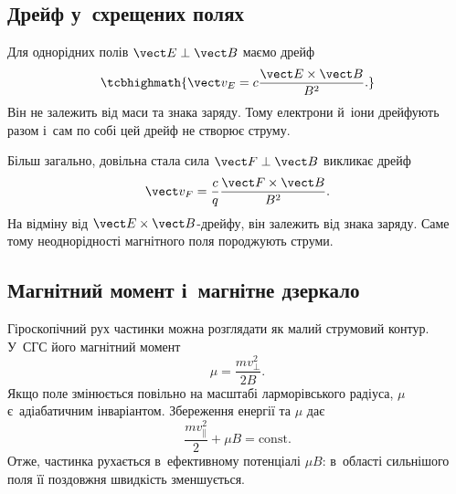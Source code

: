\subsection*{Дрейф у~схрещених полях}



Для однорідних полів $\vect E\perp\vect B$ маємо дрейф
\begin{equation}\label{eq:ExB}
	\tcbhighmath{\vect v_E=c\frac{\vect E\times\vect B}{B^2}.}
\end{equation}
Він не залежить від маси та знака заряду. Тому електрони й~іони дрейфують разом і~сам по
собі цей дрейф не створює струму.

Більш загально, довільна стала сила $\vect F\perp\vect B$ викликає дрейф
\begin{equation}\label{eq:drift-force}
	\vect v_F=\frac{c}{q}\frac{\vect F\times\vect B}{B^2}.
\end{equation}
На відміну від $\vect E\times\vect B$-дрейфу, він залежить від знака заряду. Саме тому
неоднорідності магнітного поля породжують струми.



\subsection*{Магнітний момент і~магнітне дзеркало}



Гіроскопічний рух частинки можна розглядати як малий струмовий контур. У~СГС його
магнітний момент
\begin{equation}\label{eq:mu}
	\mu=\frac{mv_\perp^2}{2B}.
\end{equation}
Якщо поле змінюється повільно на масштабі ларморівського радіуса, $\mu$ є~адіабатичним
інваріантом. Збереження енергії та $\mu$ дає
\begin{equation}\label{eq:energy-mu}
	\frac{mv_\parallel^2}{2}+\mu B=\mathrm{const}.
\end{equation}
Отже, частинка рухається в~ефективному потенціалі $\mu B$: в~області сильнішого поля її
поздовжня швидкість зменшується.


